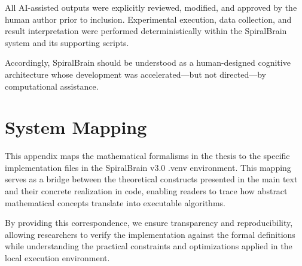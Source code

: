 \documentclass[12pt,a4paper]{report}
\begin{document}
All AI-assisted outputs were explicitly reviewed, modified, and approved by the human author prior to inclusion. Experimental execution, data collection, and result interpretation were performed deterministically within the SpiralBrain system and its supporting scripts.

Accordingly, SpiralBrain should be understood as a human-designed cognitive architecture whose development was accelerated—but not directed—by computational assistance.

\chapter{System Mapping}

This appendix maps the mathematical formalisms in the thesis to the specific implementation files in the SpiralBrain v3.0 .venv environment. This mapping serves as a bridge between the theoretical constructs presented in the main text and their concrete realization in code, enabling readers to trace how abstract mathematical concepts translate into executable algorithms. 

By providing this correspondence, we ensure transparency and reproducibility, allowing researchers to verify the implementation against the formal definitions while understanding the practical constraints and optimizations applied in the local execution environment.


\begingroup
\setlength{\tabcolsep}{6pt}
\renewcommand{\arraystretch}{1.2}
\end{document}
